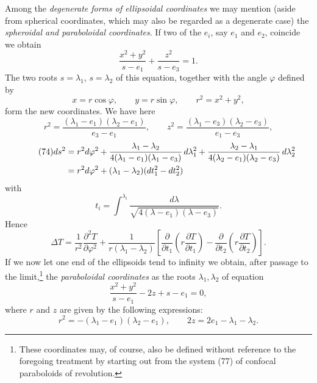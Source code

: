Among the \emph{degenerate forms of ellipsoidal coordinates} we may mention (aside from spherical coordinates, which may also be regarded as a degenerate case) the \emph{spheroidal and paraboloidal coordinates}. If two of the $e_i$, say $e_1$ and $e_2$, coincide we obtain
\begin{equation}\tag{72}
\frac{x^2+y^2}{s-e_1}+\frac{z^2}{s-e_3}=1.
\end{equation}
The two roots $s=\lambda_1$, $s=\lambda_2$ of this equation, together with the angle $\varphi$ defined by
\[
x=r\cos\varphi,\qquad y=r\sin\varphi,\qquad r^2=x^2+y^2,
\]
form the new coordinates. We have here
\begin{equation}\tag{73}
r^2=\frac{(\lambda_1-e_1)(\lambda_2-e_1)}{e_3-e_1},\qquad
z^2=\frac{(\lambda_1-e_3)(\lambda_2-e_3)}{e_1-e_3},
\end{equation}
\begin{align}\tag{74}
ds^2={}&r^2d\varphi^2+\frac{\lambda_1-\lambda_2}{4(\lambda_1-e_1)(\lambda_1-e_3)}\,d\lambda_1^2
+\frac{\lambda_2-\lambda_1}{4(\lambda_2-e_1)(\lambda_2-e_3)}\,d\lambda_2^2\notag\\
={}&r^2d\varphi^2+(\lambda_1-\lambda_2)(dt_1^2-dt_2^2)
\end{align}
with
\begin{equation}\tag{75}
t_i=\int^{\lambda_i}\frac{d\lambda}{\sqrt{4(\lambda-e_1)(\lambda-e_3)}}.
\end{equation}
Hence
\begin{equation}\tag{76}
\Delta T=\frac1{r^2}\frac{\partial^2T}{\partial\varphi^2}
+\frac1{r(\lambda_1-\lambda_2)}\left[\frac{\partial}{\partial t_1}\left(r\frac{\partial T}{\partial t_1}\right)-\frac{\partial}{\partial t_2}\left(r\frac{\partial T}{\partial t_2}\right)\right].
\end{equation}
If we now let one end of the ellipsoids tend to infinity we obtain, after passage to the limit,\footnote{These coordinates may, of course, also be defined without reference to the foregoing treatment by starting out from the system (77) of confocal paraboloids of revolution.} the \emph{paraboloidal coordinates} as the roots $\lambda_1,\lambda_2$ of equation
\begin{equation}\tag{77}
\frac{x^2+y^2}{s-e_1}-2z+s-e_1=0,
\end{equation}
where $r$ and $z$ are given by the following expressions:
\begin{equation}\tag{78}
r^2=-(\lambda_1-e_1)(\lambda_2-e_1),\qquad 2z=2e_1-\lambda_1-\lambda_2.
\end{equation}
